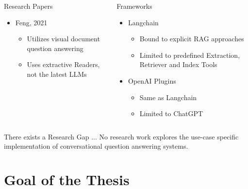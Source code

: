 \documentclass{beamer}
\begin{document}
{\begin{overprint}
\begin{columns}[t]
    \end{columns}
    \vfill
      \begin{columns}[t]
        \begin{column}{.5\textwidth}
        {\color{unirot}Research Papers}
        \begin{itemize}
          \item Feng, 2021
          \begin{itemize}
            \item Utilizes visual document question answering
            \item Uses extractive Readers, not the latest LLMs
          \end{itemize}
        \end{itemize}
        \end{column}
    
    
        \begin{column}{.5\textwidth}
        {\color{unirot}Frameworks} 
        \begin{itemize}
          \item Langchain
          \begin{itemize}
            \item Bound to explicit RAG approaches
            \item Limited to predefined Extraction, Retriever and Index Tools 
          \end{itemize}
          \item OpenAI Plugins
            \begin{itemize}
              \item Same as Langchain
              \item Limited to ChatGPT
            \end{itemize}
        \end{itemize}
        \end{column}
    
        \end{columns}
        \vfill
    \begin{block}{There exists a Research Gap ...}
    No research work explores the use-case specific implementation of conversational question answering systems.
    \end{block}
  \end{overprint}
}

\section[Thesis' Goal]{Goal of the Thesis}
\end{document}
